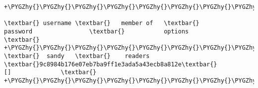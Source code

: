 \documentclass[letterpaper,10pt,english]{sphinxmanual}
\def\PYGZhy{\char`\-}
\begin{document}
\begin{Verbatim}[commandchars=\\\{\}]
+\PYGZhy{}\PYGZhy{}\PYGZhy{}\PYGZhy{}\PYGZhy{}\PYGZhy{}\PYGZhy{}\PYGZhy{}\PYGZhy{}\PYGZhy{}+\PYGZhy{}\PYGZhy{}\PYGZhy{}\PYGZhy{}\PYGZhy{}\PYGZhy{}\PYGZhy{}\PYGZhy{}\PYGZhy{}\PYGZhy{}\PYGZhy{}\PYGZhy{}\PYGZhy{}\PYGZhy{}\PYGZhy{}+\PYGZhy{}\PYGZhy{}\PYGZhy{}\PYGZhy{}\PYGZhy{}\PYGZhy{}\PYGZhy{}\PYGZhy{}\PYGZhy{}\PYGZhy{}\PYGZhy{}\PYGZhy{}\PYGZhy{}\PYGZhy{}\PYGZhy{}\PYGZhy{}\PYGZhy{}\PYGZhy{}\PYGZhy{}\PYGZhy{}\PYGZhy{}\PYGZhy{}\PYGZhy{}\PYGZhy{}\PYGZhy{}\PYGZhy{}\PYGZhy{}\PYGZhy{}\PYGZhy{}\PYGZhy{}\PYGZhy{}\PYGZhy{}\PYGZhy{}\PYGZhy{}\PYGZhy{}\PYGZhy{}\PYGZhy{}\PYGZhy{}\PYGZhy{}\PYGZhy{}+\PYGZhy{}\PYGZhy{}\PYGZhy{}\PYGZhy{}\PYGZhy{}\PYGZhy{}\PYGZhy{}\PYGZhy{}\PYGZhy{}\PYGZhy{}\PYGZhy{}\PYGZhy{}\PYGZhy{}\PYGZhy{}\PYGZhy{}\PYGZhy{}\PYGZhy{}\PYGZhy{}\PYGZhy{}\PYGZhy{}\PYGZhy{}\PYGZhy{}\PYGZhy{}\PYGZhy{}\PYGZhy{}\PYGZhy{}\PYGZhy{}\PYGZhy{}\PYGZhy{}\PYGZhy{}+

\textbar{} username \textbar{}   member of   \textbar{}                password                \textbar{}           options            \textbar{}
+\PYGZhy{}\PYGZhy{}\PYGZhy{}\PYGZhy{}\PYGZhy{}\PYGZhy{}\PYGZhy{}\PYGZhy{}\PYGZhy{}\PYGZhy{}+\PYGZhy{}\PYGZhy{}\PYGZhy{}\PYGZhy{}\PYGZhy{}\PYGZhy{}\PYGZhy{}\PYGZhy{}\PYGZhy{}\PYGZhy{}\PYGZhy{}\PYGZhy{}\PYGZhy{}\PYGZhy{}\PYGZhy{}+\PYGZhy{}\PYGZhy{}\PYGZhy{}\PYGZhy{}\PYGZhy{}\PYGZhy{}\PYGZhy{}\PYGZhy{}\PYGZhy{}\PYGZhy{}\PYGZhy{}\PYGZhy{}\PYGZhy{}\PYGZhy{}\PYGZhy{}\PYGZhy{}\PYGZhy{}\PYGZhy{}\PYGZhy{}\PYGZhy{}\PYGZhy{}\PYGZhy{}\PYGZhy{}\PYGZhy{}\PYGZhy{}\PYGZhy{}\PYGZhy{}\PYGZhy{}\PYGZhy{}\PYGZhy{}\PYGZhy{}\PYGZhy{}\PYGZhy{}\PYGZhy{}\PYGZhy{}\PYGZhy{}\PYGZhy{}\PYGZhy{}\PYGZhy{}\PYGZhy{}+\PYGZhy{}\PYGZhy{}\PYGZhy{}\PYGZhy{}\PYGZhy{}\PYGZhy{}\PYGZhy{}\PYGZhy{}\PYGZhy{}\PYGZhy{}\PYGZhy{}\PYGZhy{}\PYGZhy{}\PYGZhy{}\PYGZhy{}\PYGZhy{}\PYGZhy{}\PYGZhy{}\PYGZhy{}\PYGZhy{}\PYGZhy{}\PYGZhy{}\PYGZhy{}\PYGZhy{}\PYGZhy{}\PYGZhy{}\PYGZhy{}\PYGZhy{}\PYGZhy{}\PYGZhy{}+
\textbar{}  sandy   \textbar{}    readers    \textbar{}9c8984b176e07eb7ba9ff1e3ada5a43ecb8a812e\textbar{}              []              \textbar{}
+\PYGZhy{}\PYGZhy{}\PYGZhy{}\PYGZhy{}\PYGZhy{}\PYGZhy{}\PYGZhy{}\PYGZhy{}\PYGZhy{}\PYGZhy{}+\PYGZhy{}\PYGZhy{}\PYGZhy{}\PYGZhy{}\PYGZhy{}\PYGZhy{}\PYGZhy{}\PYGZhy{}\PYGZhy{}\PYGZhy{}\PYGZhy{}\PYGZhy{}\PYGZhy{}\PYGZhy{}\PYGZhy{}+\PYGZhy{}\PYGZhy{}\PYGZhy{}\PYGZhy{}\PYGZhy{}\PYGZhy{}\PYGZhy{}\PYGZhy{}\PYGZhy{}\PYGZhy{}\PYGZhy{}\PYGZhy{}\PYGZhy{}\PYGZhy{}\PYGZhy{}\PYGZhy{}\PYGZhy{}\PYGZhy{}\PYGZhy{}\PYGZhy{}\PYGZhy{}\PYGZhy{}\PYGZhy{}\PYGZhy{}\PYGZhy{}\PYGZhy{}\PYGZhy{}\PYGZhy{}\PYGZhy{}\PYGZhy{}\PYGZhy{}\PYGZhy{}\PYGZhy{}\PYGZhy{}\PYGZhy{}\PYGZhy{}\PYGZhy{}\PYGZhy{}\PYGZhy{}\PYGZhy{}+\PYGZhy{}\PYGZhy{}\PYGZhy{}\PYGZhy{}\PYGZhy{}\PYGZhy{}\PYGZhy{}\PYGZhy{}\PYGZhy{}\PYGZhy{}\PYGZhy{}\PYGZhy{}\PYGZhy{}\PYGZhy{}\PYGZhy{}\PYGZhy{}\PYGZhy{}\PYGZhy{}\PYGZhy{}\PYGZhy{}\PYGZhy{}\PYGZhy{}\PYGZhy{}\PYGZhy{}\PYGZhy{}\PYGZhy{}\PYGZhy{}\PYGZhy{}\PYGZhy{}\PYGZhy{}+
\end{Verbatim}
\end{document}
